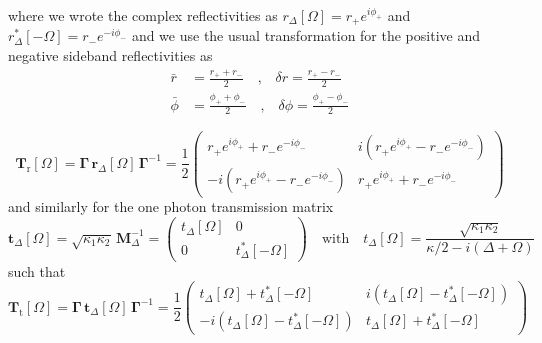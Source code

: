 where we wrote the complex reflectivities as $r_{\Delta}[\Omega] = r_+ e^{i \phi_+}$ and $r_{\Delta}^*[-\Omega] = r_- e^{-i \phi_-}$ and we use the usual transformation for the positive and negative sideband reflectivities as
\begin{equation}
\begin{split}
  \bar r  &= \frac{r_+ + r_-}{2} \quad \text{,} \quad  \delta r  = \frac{r_+ - r_-}{2} \\
  \bar \phi &= \frac{\phi_+ + \phi_-}{2} \quad \text{,} \quad  \delta \phi = \frac{\phi_+ - \phi_-}{2}
\end{split}
\end{equation}



\begin{equation}
\mathbf{T}_{\mathrm{r}}[\Omega] = \mathbf{\Gamma} \, \mathbf{r}_{\Delta}[\Omega] \, \mathbf{\Gamma}^{-1} = \frac{1}{2}  \begin{pmatrix}
    r_+e^{i \phi_+}  + r_-e^{-i \phi_-}  & i(r_+e^{i \phi_+}  - r_-e^{-i \phi_-}) \\
    -i(r_+e^{i \phi_+}  - r_-e^{-i \phi_-}) & r_+e^{i \phi_+}  + r_-e^{-i \phi_-}
  \end{pmatrix}
\end{equation}
and similarly for the one photon transmission matrix
\begin{equation}
  \mathbf{t}_{\Delta}[\Omega] = \sqrt{\kappa_1 \kappa_2} \, \mathbf{M}^{-1}_\Delta = \begin{pmatrix}
    t_{\Delta}[\Omega] & 0 \\
    0 & t_{\Delta}^*[-\Omega]
  \end{pmatrix} \quad \text{with} \quad t_{\Delta}[\Omega] = \frac{\sqrt{\kappa_1 \kappa_2}}{\kappa/2 - i(\Delta + \Omega)}
\end{equation}
such that
\begin{equation}
\mathbf{T}_{\mathrm{t}}[\Omega] = \mathbf{\Gamma} \, \mathbf{t}_{\Delta}[\Omega] \, \mathbf{\Gamma}^{-1} = \frac{1}{2}  \begin{pmatrix}
    t_{\Delta}[\Omega] + t_{\Delta}^*[-\Omega] & i(t_{\Delta}[\Omega] - t_{\Delta}^*[-\Omega]) \\
    -i(t_{\Delta}[\Omega] - t_{\Delta}^*[-\Omega]) & t_{\Delta}[\Omega] + t_{\Delta}^*[-\Omega]
  \end{pmatrix}
\end{equation}


